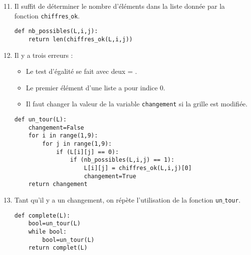 \documentclass[a4paper,twoside,french,10pt]{VcCours}
\begin{document}
\begin{enumerate}
\setcounter{enumi}{10}
\item Il suffit de déterminer le nombre d'éléments dans la liste donnée par la fonction {\tt chiffres$\_$ok}.

\begin{center}
\begin{minipage}{0.7\textwidth}
\begin{lstlisting}
def nb_possibles(L,i,j):
    return len(chiffres_ok(L,i,j))
\end{lstlisting}
\end{minipage}
\end{center}

\item Il y a trois erreurs :
\begin{itemize}
\item Le test d'égalité se fait avec deux \og = \fg.
\item Le premier élément d'une liste a pour indice $0$.
\item Il faut changer la valeur de la variable {\tt changement} si la grille est modifiée.
\end{itemize}

\begin{center}
\begin{minipage}{0.7\textwidth}
		
\begin{lstlisting}
def un_tour(L):
    changement=False
    for i in range(1,9):
        for j in range(1,9):
            if (L[i][j] == 0):
                if (nb_possibles(L,i,j) == 1):
                    L[i][j] = chiffres_ok(L,i,j)[0]
                    changement=True
    return changement
\end{lstlisting}
\end{minipage}
\end{center}
\item Tant qu'il y a un changement, on répète l'utilisation de la fonction {\tt un$\_$tour}.

\begin{center}
\begin{minipage}{0.7\textwidth}
		
\begin{lstlisting}
def complete(L):
    bool=un_tour(L)
    while bool:
        bool=un_tour(L)
    return complet(L)
\end{lstlisting}
\end{minipage}
\end{center}
\end{enumerate}
\end{document}
